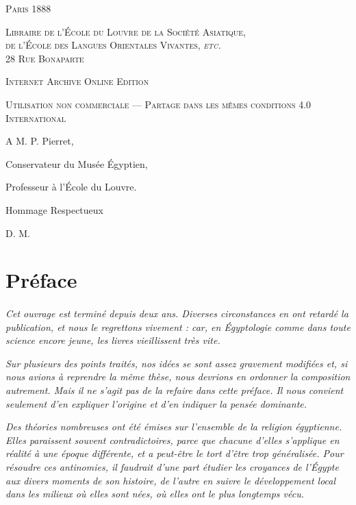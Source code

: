 \documentclass[a4paper, 11pt, oneside]{article}
\begin{document}
\begin{titlepage}
	{\small\scshape Paris 1888}
	
	{\small\scshape{Libraire de l'École du Louvre de la Société Asiatique,\\ de l'École des Langues Orientales Vivantes, \emph{etc.} \\ 28 Rue Bonaparte}}
	
	\vspace{0.5\baselineskip} %

        \scshape Internet Archive Online Edition  %
	
	{\scshape\small Utilisation non commerciale --- Partage dans les mêmes conditions 4.0 International} %
\end{titlepage}
\setlength{\parskip}{1mm plus1mm minus1mm}
\clearpage
\tableofcontents
\clearpage
\Large
\vspace*{\fill}
A M. P. Pierret,

Conservateur du Musée Égyptien,

Professeur à l'École du Louvre.

Hommage Respectueux

D. M.
\vspace*{\fill}
\clearpage
\section*{Préface}
\paragraph{}
\emph{Cet ouvrage est terminé depuis deux ans. Diverses circonstances en ont retardé la publication, et nous le regrettons vivement : car, en Égyptologie comme dans toute science encore jeune, les livres vieillissent très vite.}

\emph{Sur plusieurs des points traités, nos idées se sont assez gravement modifiées et, si nous avions à reprendre la même thèse, nous devrions en ordonner la composition autrement. Mais il ne s'agit pas de la refaire dans cette préface. Il nous convient seulement d'en expliquer l'origine et d'en indiquer la pensée dominante.}

\emph{Des théories nombreuses ont été émises sur l'ensemble de la religion égyptienne. Elles paraissent souvent contradictoires, parce que chacune d'elles s'applique en réalité à une époque différente, et a peut-être le tort d'être trop généralisée. Pour résoudre ces antinomies, il faudrait d'une part étudier les croyances de l'Égypte aux divers moments de son histoire, de l'autre en suivre le développement local dans les milieux où elles sont nées, où elles ont le plus longtemps vécu.}
\end{document}
